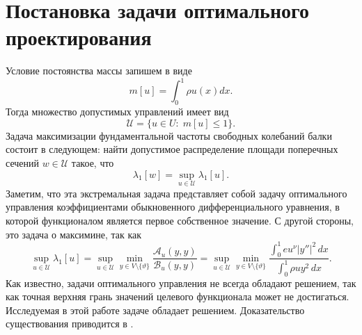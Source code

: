 \section{Постановка задачи оптимального проектирования}
\label{section:OptimalControlProblem}
%
%
%
%
%
\par
Условие постоянства массы запишем в виде
\begin{equation} 
\label{Condition:ConstantV}
m[u] = \int^1_0{\rho u(x)dx}.
\end{equation}
%
%
%
Тогда множество допустимых управлений имеет вид
\[
\mathcal{U}
=
\{
u \in U : \;
m[u] \leq 1
\}.
\]
Задача максимизации фундаментальной частоты свободных колебаний балки состоит в следующем:
найти допустимое распределение площади поперечных сечений $w \in \mathcal{U}$
такое, что
\[
\lambda_1[w] =
\sup_{u \in \mathcal{U}}
\lambda_1[u].
\]
%
%
%
Заметим,
что эта экстремальная задача представляет собой задачу оптимального управления коэффициентами
обыкновенного дифференциального уравнения,
в которой функционалом является первое собственное значение.
%
%
%
С другой стороны,
это задача о максимине, так как
\[
\sup_{u \in \mathcal{U}}
\lambda_1[u] =
\sup_{u \in \mathcal{U}}
\min_{y \in V \setminus \{ \vartheta \}} \frac{\mathcal{A}_u(y,y)}{\mathcal{B}_u(y,y)}
=
\sup_{u \in \mathcal{U}}
\min_{y \in V \setminus \{ \vartheta \}}
\frac
{\int_0^1 eu^\nu |y''|^2 \, dx}
{\int_0^1 \rho u y^2 \, dx}.
\]
%
%
%
Как известно,
задачи оптимального управления не всегда обладают решением,
так как
точная верхняя грань значений целевого функционала
может не достигаться.
%
%
%
Исследуемая в этой работе задаче
обладает решением.
Доказательство существования приводится в
\cite{article:Existence}.